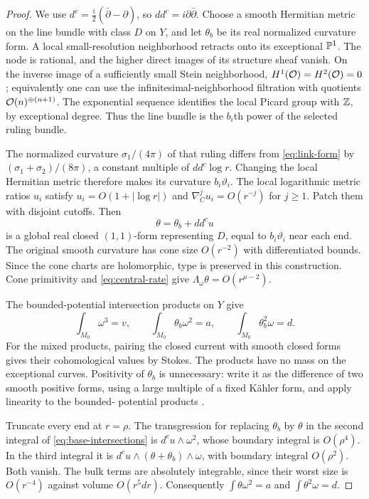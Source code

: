 \begin{proof}
We use $d^c=\frac i2(\bar\partial-\partial)$, so $dd^c=i\partial\bar\partial$.
Choose a smooth Hermitian metric on the line bundle with class $D$ on
$Y$, and let $\theta_b$ be its real normalized curvature form. A local
small-resolution neighborhood retracts onto its exceptional $\mathbb P^1$.
The node is rational, and the higher direct images of its structure sheaf
vanish. On the inverse image of a sufficiently small Stein neighborhood,
$H^1(\mathcal O)=H^2(\mathcal O)=0$; equivalently one can use the infinitesimal-neighborhood
filtration with quotients $\mathcal O(n)^{\oplus(n+1)}$. The exponential sequence
identifies the local Picard group with $\mathbb Z$, by exceptional degree.
Thus the line bundle is the $b_i$th power of the selected ruling bundle.

The normalized curvature $\sigma_1/(4\pi)$ of that ruling differs from
\eqref{eq:link-form} by $(\sigma_1+\sigma_2)/(8\pi)$, a constant
multiple of $dd^c\log r$. Changing the local Hermitian metric therefore
makes its curvature $b_i\vartheta_i$. The local logarithmic metric ratios
$u_i$ satisfy $u_i=O(1+|\log r|)$ and
$\nabla_C^ju_i=O(r^{-j})$ for $j\ge1$. Patch them with disjoint cutoffs.
Then
\[
 \theta=\theta_b+dd^cu
\]
is a global real closed $(1,1)$-form representing $D$, equal to
$b_i\vartheta_i$ near each end. The original smooth curvature has
cone size $O(r^{-2})$ with differentiated bounds. Since the cone charts
are holomorphic, type is preserved in this construction. Cone primitivity
and \eqref{eq:central-rate} give
$\Lambda_\omega\theta=O(r^{\mu-2})$.

The bounded-potential intersection products on $Y$ give
\begin{equation}\label{eq:base-intersections}
 \int_{M_0}\omega^3=v,\qquad
 \int_{M_0}\theta_b\omega^2=a,\qquad
 \int_{M_0}\theta_b^2\omega=d.
\end{equation}
For the mixed products, pairing the closed current with smooth closed
forms gives their cohomological values by Stokes. The products have no
mass on the exceptional curves. Positivity of $\theta_b$ is unnecessary:
write it as the difference of two smooth positive forms, using a large
multiple of a fixed K\"ahler form, and apply linearity to the bounded-
potential products \cite{bedford-taylor,egz}.

Truncate every end at $r=\rho$. The transgression for replacing
$\theta_b$ by $\theta$ in the second integral of
\eqref{eq:base-intersections} is $d^cu\wedge\omega^2$, whose boundary
integral is $O(\rho^4)$. In the third integral it is
$d^cu\wedge(\theta+\theta_b)\wedge\omega$, with boundary integral
$O(\rho^2)$. Both vanish. The bulk terms are absolutely integrable,
since their worst size is $O(r^{-4})$ against volume $O(r^5dr)$.
Consequently $\int\theta\omega^2=a$ and $\int\theta^2\omega=d$.


\end{proof}
